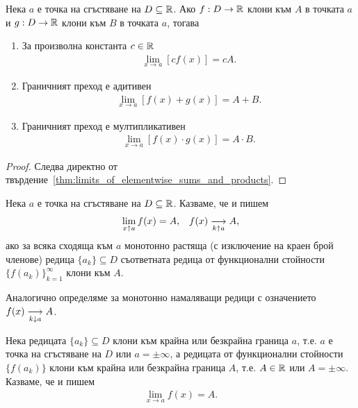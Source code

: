 \documentclass[numbers=endperiod, bibliography=totocnumbered]{scrartcl}
\begin{document}
\begin{proposition}\label{thm:limit_is_linear_and_multiplicative}
  Нека \( a \) е точка на сгъстяване на \( D \subseteq \R \). Ако \( f: D \to \R \) клони към \( A \) в точката \( a \) и \( g: D \to \R \) клони към \( B \) в точката \( a \), тогава
  \begin{enumerate}
    \item За произволна константа \( c \in \R \)
    \begin{align*}
      \lim_{x \to a} [c f(x)] = c A.
    \end{align*}

    \item Граничният преход е адитивен
    \begin{align*}
      \lim_{x \to a} [f(x) + g(x)] = A + B.
    \end{align*}

    \item Граничният преход е мултипликативен
    \begin{align*}
      \lim_{x \to a} [f(x) \cdot g(x)] = A \cdot B.
    \end{align*}
  \end{enumerate}
\end{proposition}
\begin{proof}
  Следва директно от твърдение~\ref{thm:limits_of_elementwise_sums_and_products}.
\end{proof}

\begin{definition}
  Нека \( a \) е точка на сгъстяване на \( D \subseteq \R \). Казваме, че  и пишем
  \begin{align*}
    \lim_{x \uparrow a} f(x) = A,
    &&
    f(x) \Conv[k \uparrow a]{} A,
  \end{align*}
  ако за всяка сходяща към \( a \) монотонно растяща (с изключение на краен брой членове) редица \( \{ a_k \} \subseteq D \) съответната редица от функционални стойности \( {\{ f(a_k) \}}_{k=1}^\infty \) клони към \( A \).

  Аналогично определяме  за монотонно намаляващи редици с означението \( f(x) \Conv[k \downarrow a]{} A \).
\end{definition}

\begin{definition}
  Нека редицата \( \{ a_k \} \subseteq D \) клони към крайна или безкрайна граница \( a \), т.е. \( a \) е точка на сгъстяване на \( D \) или \( a = \pm \infty \), а редицата от функционални стойности \( \{ f(a_k) \} \) клони към крайна или безкрайна граница \( A \), т.е. \( A \in \R \) или \( A = \pm \infty \). Казваме, че  и пишем
  \begin{align*}
    \lim_{x \to a} f(x) = A.
  \end{align*}
\end{definition}
\end{document}
